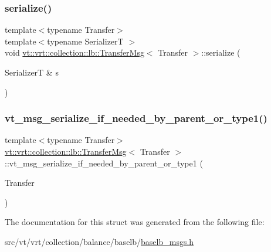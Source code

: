 \mbox{\label{structvt_1_1vrt_1_1collection_1_1lb_1_1_transfer_msg_a230421d821c61d152b596b6c024010fd}} 
\subsubsection{\texorpdfstring{serialize()}{serialize()}}
{\footnotesize\ttfamily template$<$typename Transfer$>$ \\
template$<$typename SerializerT $>$ \\
void \hyperlink{structvt_1_1vrt_1_1collection_1_1lb_1_1_transfer_msg}{vt\+::vrt\+::collection\+::lb\+::\+Transfer\+Msg}$<$ Transfer $>$\+::serialize (\begin{DoxyParamCaption}\item[{SerializerT \&}]{s }\end{DoxyParamCaption})\hspace{0.3cm}{\ttfamily [inline]}}

\mbox{\label{structvt_1_1vrt_1_1collection_1_1lb_1_1_transfer_msg_a5ff4c5168e29e0ad67c32fa197eb048d}} 
\subsubsection{\texorpdfstring{vt\+\_\+msg\+\_\+serialize\+\_\+if\+\_\+needed\+\_\+by\+\_\+parent\+\_\+or\+\_\+type1()}{vt\_msg\_serialize\_if\_needed\_by\_parent\_or\_type1()}}
{\footnotesize\ttfamily template$<$typename Transfer$>$ \\
\hyperlink{structvt_1_1vrt_1_1collection_1_1lb_1_1_transfer_msg}{vt\+::vrt\+::collection\+::lb\+::\+Transfer\+Msg}$<$ Transfer $>$\+::vt\+\_\+msg\+\_\+serialize\+\_\+if\+\_\+needed\+\_\+by\+\_\+parent\+\_\+or\+\_\+type1 (\begin{DoxyParamCaption}\item[{Transfer}]{ }\end{DoxyParamCaption})}



The documentation for this struct was generated from the following file\+:\begin{DoxyCompactItemize}
\item 
src/vt/vrt/collection/balance/baselb/\hyperlink{baselb__msgs_8h}{baselb\+\_\+msgs.\+h}\end{DoxyCompactItemize}
